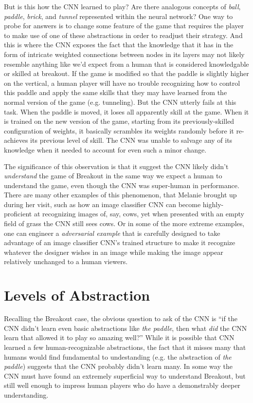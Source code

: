 \documentclass{article}
\renewcommand{\it}{\textit}
\begin{document}
But is this how the CNN learned to play? Are there analogous concepts of \it{ball}, \it{paddle}, \it{brick}, and \it{tunnel} represented within the neural network?
One way to probe for answers is to change some feature of the game that requires the player to make use of one of these abstractions in order to readjust their strategy.
And this is where the CNN exposes the fact that the knowledge that it has in the form of intricate weighted connections between nodes in its layers may not likely resemble anything like we'd expect from a human that is considered knowledgable or skilled at breakout.
If the game is modified so that the paddle is slightly higher on the vertical, a human player will have no trouble recognizing how to control this paddle and apply the same skills that they may have learned from the normal version of the game (e.g. tunneling).
But the CNN utterly fails at this task.
When the paddle is moved, it loses all apparently skill at the game.
When it is trained on the new version of the game, starting from its previously-skilled configuration of weights, it basically scrambles its weights randomly before it re-achieves its previous level of skill.
The CNN was unable to salvage any of its knowledge when it needed to account for even such a minor change.

The significance of this observation is that it suggest the CNN likely didn't \it{understand} the game of Breakout in the same way we expect a human to understand the game, even though the CNN was super-human in performance. There are many other examples of this phenomenon, that Melanie brought up during her visit, such as how an image classifier CNN can become highly-proficient at recognizing images of, say, cows, yet when presented with an empty field of grass the CNN still sees cows. Or in some of the more extreme examples, one can engineer a \it{adversarial example} that is carefully designed to take advantage of an image classifier CNN's trained structure to make it recognize whatever the designer wishes in an image while making the image appear relatively unchanged to a human viewers.

\section{Levels of Abstraction}

Recalling the Breakout case, the obvious question to ask of the CNN is ``if the CNN didn't learn even basic abstractions like \it{the paddle}, then what \it{did} the CNN learn that allowed it to play so amazing well?'' While it is possible that CNN learned a few human-recognizable abstractions, the fact that it misses many that humans would find fundamental to undestanding (e.g. the abstraction of \it{the paddle}) suggests that the CNN probably didn't learn many.
In some way the CNN must have found an extremely superficial way to understand Breakout, but still well enough to impress human players who do have a demonstrably deeper understanding.
\end{document}
